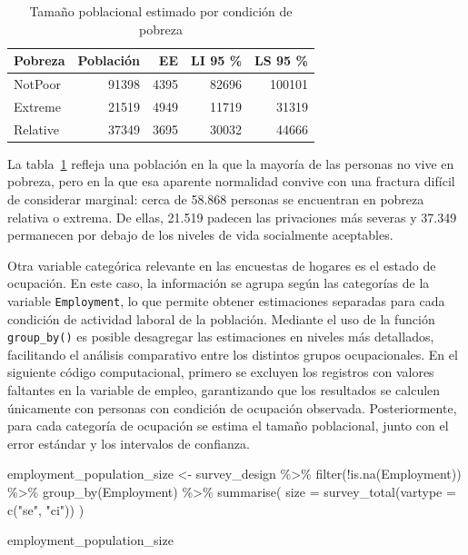 \documentclass[
  spanish,
  11pt,
  letterpaper,
  oneside,
  open=any]{scrbook}
\newenvironment{Shaded}{\begin{snugshade}}{\end{snugshade}}
\newcommand{\AttributeTok}[1]{\textcolor[rgb]{0.40,0.45,0.13}{#1}}
\newcommand{\FunctionTok}[1]{\textcolor[rgb]{0.28,0.35,0.67}{#1}}
\newcommand{\NormalTok}[1]{\textcolor[rgb]{0.00,0.23,0.31}{#1}}
\newcommand{\OtherTok}[1]{\textcolor[rgb]{0.00,0.23,0.31}{#1}}
\newcommand{\SpecialCharTok}[1]{\textcolor[rgb]{0.37,0.37,0.37}{#1}}
\newcommand{\StringTok}[1]{\textcolor[rgb]{0.13,0.47,0.30}{#1}}
\begin{document}
{

\begin{longtable}[]{@{}lrrrr@{}}

\caption{\label{tbl-tamano-pobreza}Tamaño poblacional estimado por
condición de pobreza}

\tabularnewline

\toprule\noalign{}
Pobreza & Población & EE & LI 95 \% & LS 95 \% \\
\midrule\noalign{}
\endhead
\bottomrule\noalign{}
\endlastfoot
NotPoor & 91398 & 4395 & 82696 & 100101 \\
Extreme & 21519 & 4949 & 11719 & 31319 \\
Relative & 37349 & 3695 & 30032 & 44666 \\

\end{longtable}

}

La tabla~\ref{tbl-tamano-pobreza} refleja una población en la que la
mayoría de las personas no vive en pobreza, pero en la que esa aparente
normalidad convive con una fractura difícil de considerar marginal:
cerca de 58.868 personas se encuentran en pobreza relativa o extrema. De
ellas, 21.519 padecen las privaciones más severas y 37.349 permanecen
por debajo de los niveles de vida socialmente aceptables.

Otra variable categórica relevante en las encuestas de hogares es el
estado de ocupación. En este caso, la información se agrupa según las
categorías de la variable \texttt{Employment}, lo que permite obtener
estimaciones separadas para cada condición de actividad laboral de la
población. Mediante el uso de la función \texttt{group\_by()} es posible
desagregar las estimaciones en niveles más detallados, facilitando el
análisis comparativo entre los distintos grupos ocupacionales. En el
siguiente código computacional, primero se excluyen los registros con
valores faltantes en la variable de empleo, garantizando que los
resultados se calculen únicamente con personas con condición de
ocupación observada. Posteriormente, para cada categoría de ocupación se
estima el tamaño poblacional, junto con el error estándar y los
intervalos de confianza.

\begin{Shaded}
\begin{Highlighting}[]
\NormalTok{employment\_population\_size }\OtherTok{\textless{}{-}}\NormalTok{ survey\_design }\SpecialCharTok{\%\textgreater{}\%}
  \FunctionTok{filter}\NormalTok{(}\SpecialCharTok{!}\FunctionTok{is.na}\NormalTok{(Employment)) }\SpecialCharTok{\%\textgreater{}\%}
  \FunctionTok{group\_by}\NormalTok{(Employment) }\SpecialCharTok{\%\textgreater{}\%}
  \FunctionTok{summarise}\NormalTok{(}
    \AttributeTok{size =} \FunctionTok{survey\_total}\NormalTok{(}\AttributeTok{vartype =} \FunctionTok{c}\NormalTok{(}\StringTok{"se"}\NormalTok{, }\StringTok{"ci"}\NormalTok{))}
\NormalTok{  )}

\NormalTok{employment\_population\_size}
\end{Highlighting}
\end{Shaded}
\end{document}
